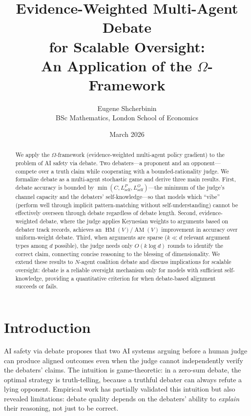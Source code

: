 \documentclass[11pt,a4paper]{article}
\title{Evidence-Weighted Multi-Agent Debate\\
for Scalable Oversight:\\
An Application of the $\Omega$-Framework}
\author{Eugene Shcherbinin\\
\small BSc Mathematics, London School of Economics}
\date{March 2026}
\DeclareMathOperator{\AM}{AM}
\DeclareMathOperator{\HM}{HM}
\newcommand{\Lself}{L_{\text{self}}}
\begin{document}
\maketitle

\begin{abstract}
We apply the $\Omega$-framework (evidence-weighted multi-agent policy gradient)
to the problem of AI safety via debate. Two debaters---a proponent and an
opponent---compete over a truth claim while cooperating with a
bounded-rationality judge. We formalize debate as a multi-agent stochastic
game and derive three main results. First, debate accuracy is bounded by
$\min(C, \Lself^P, \Lself^O)$---the minimum of the judge's channel capacity
and the debaters' self-knowledge---so that models which ``vibe'' (perform
well through implicit pattern-matching without self-understanding) cannot be
effectively overseen through debate regardless of debate length. Second,
evidence-weighted debate, where the judge applies Keynesian weights to
arguments based on debater track records, achieves an $\HM(V)/\AM(V)$
improvement in accuracy over uniform-weight debate. Third, when arguments
are sparse ($k \ll d$ relevant argument types among $d$ possible), the judge
needs only $O(k \log d)$ rounds to identify the correct claim, connecting
concise reasoning to the blessing of dimensionality. We extend these
results to $N$-agent coalition debate and discuss implications for scalable
oversight: debate is a reliable oversight mechanism only for models with
sufficient self-knowledge, providing a quantitative criterion for when
debate-based alignment succeeds or fails.
\end{abstract}

\tableofcontents

\section{Introduction}
\label{sec:intro}

AI safety via debate \cite{irving2018} proposes that two AI systems arguing
before a human judge can produce aligned outcomes even when the judge cannot
independently verify the debaters' claims. The intuition is game-theoretic:
in a zero-sum debate, the optimal strategy is truth-telling, because a
truthful debater can always refute a lying opponent. Empirical work
\cite{khan2024,bowman2022} has partially validated this intuition but
also revealed limitations: debate quality depends on the debaters' ability
to \emph{explain} their reasoning, not just to be correct.
\end{document}
